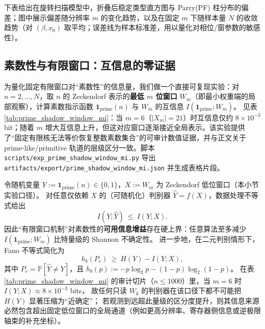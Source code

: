 下表给出在旋转扫描模型中，折叠后稳定类型直方图与 Parry(PF) 柱分布的偏差；图中展示偏差随分辨率 $m$ 的变化趋势，以及在固定 $m$ 下随样本量 $N$ 的收敛趋势（对 $(\beta,x_0)$ 取平均；误差线为样本标准差，用以量化对相位/窗参数的敏感性）。







\subsection{素数性与有限窗口：互信息的零证据}\label{subsec:prime-shadow-window-mi}
为量化固定有限窗口对“素数性”的信息量，我们做一个直接可复现实验：对 $n=2,\dots,N$，取 $n$ 的 Zeckendorf 表示的\textbf{最低 $m$ 位窗口} $W_m$（即最小权重端的局部观察），计算素数指示函数 $\mathbf{1}_{\mathrm{prime}}(n)$ 与 $W_m$ 的互信息
\(
I(\mathbf{1}_{\mathrm{prime}};W_m)
\)。
见表 \ref{tab:prime_shadow_window_mi}：当 $m=6$（$|X_m|=21$）时互信息仅约 $8\times 10^{-3}$ bit；随着 $m$ 增大互信息上升，但这对应窗口逐渐接近全局表示。该实验提供了“固定有限核无法等价恢复整数素数集合”的可审计数值证据，并与正文关于 prime-like/primitive 轨道的层级区分一致。脚本 \texttt{scripts/exp\_prime\_shadow\_window\_mi.py} 导出 \texttt{artifacts/export/prime\_shadow\_window\_mi.json} 并生成表格片段。



\begin{remark}\label{rem:prime-shadow-window-mi-algorithmic-lb}
令随机变量 \(Y:=\mathbf{1}_{\mathrm{prime}}(n)\in\{0,1\}\)，\(X:=W_m\) 为 Zeckendorf 低位窗口（本小节实验口径）。
对任意仅依赖 \(X\) 的（可随机化）判别器 \(\widehat Y=f(X)\)，数据处理不等式给出
\[
I(Y;\widehat Y)\ \le\ I(Y;X).
\]
因此“有限窗口机制”对素数性的\textbf{可用信息增益}存在硬上界：任意算法至多减少
\(
I(\mathbf{1}_{\mathrm{prime}};W_m)
\)
比特量级的 Shannon 不确定性。
进一步地，在二元判别情形下，Fano 不等式简化为
\[
h_b(P_e)\ \ge\ H(Y)-I(Y;X),
\]
其中 \(P_e=\mathbb{P}[\widehat Y\neq Y]\)，且 \(h_b(p):=-p\log_2 p-(1-p)\log_2(1-p)\)。
在表 \ref{tab:prime_shadow_window_mi} 的审计切片（\(n\le 1000\)）里，当 \(m=6\) 时 \(I(Y;X)\approx 8\times 10^{-3}\) bits，
故任何只读 \(W_6\) 的判别器在该口径下都不可能把 \(H(Y)\) 显著压缩为“近确定”；
若观测到远超此量级的区分度提升，则其信息来源必然包含超出固定低位窗口的全局通道（例如更高分辨率、寄存器侧信息或逆极限轴束的补充坐标）。
\end{remark}

